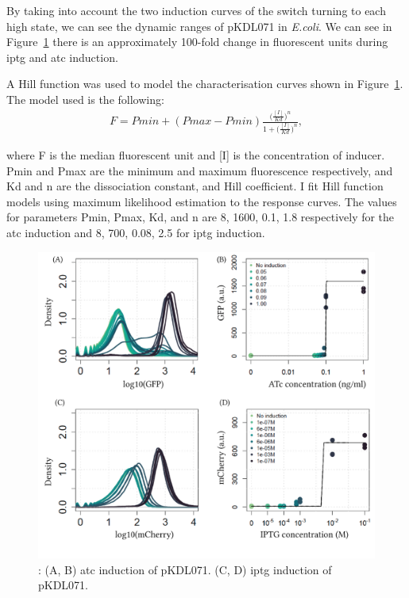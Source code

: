 By taking into account the two induction curves of the switch turning to each high state, we can see the dynamic ranges of pKDL071 in \textit{E.coli}. We can see in Figure~\ref{fig:switch_concentrations_model} there is an approximately 100-fold change in fluorescent units during \acrshort{iptg} and \acrshort{atc} induction. 

 A Hill function was used to model the characterisation curves shown in Figure~\ref{fig:switch_concentrations_model}. The model used is the following:
 \begin{align}
 	F = Pmin + (Pmax - Pmin)\frac{\Big(\frac{[I]}{Kd}\Big)^n}{1+\Big(\frac{[I]}{Kd}\Big)^n},
 \end{align}
 
where F is the median fluorescent unit and [I] is the concentration of inducer. Pmin and Pmax are the minimum and maximum fluorescence respectively, and Kd and n are the dissociation constant, and Hill coefficient. I fit Hill function models using maximum likelihood estimation to the response curves. The values for parameters Pmin, Pmax, Kd, and n are 8, 1600, 0.1, 1.8 respectively for the \acrshort{atc} induction and 8, 700, 0.08, 2.5 for \acrshort{iptg} induction. 

\begin{figure}[tb]
	\begin{center}
\includegraphics[width=\textwidth]{../../chapters/chapterABCFlow/images/pKDL071_concentrations_model_fit.png}
\caption[LoF caption]{\label{fig:switch_concentrations_model}: (A, B) \acrshort{atc} induction of pKDL071. (C, D) \acrshort{iptg} induction of pKDL071.}
\end{center}
\end{figure}


